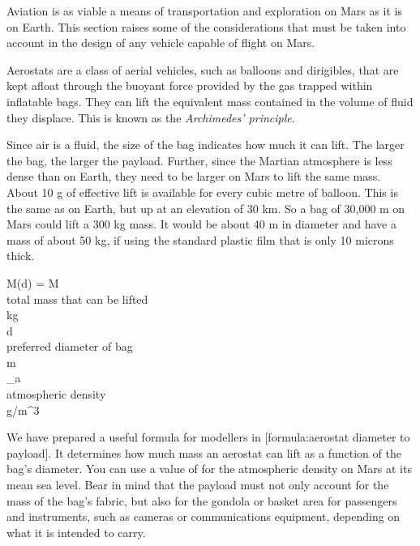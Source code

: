 

Aviation is as viable a means of transportation and exploration on Mars as it is on Earth. This section raises some of the considerations that must be taken into account in the design of any vehicle capable of flight on Mars.

Aerostats are a class of aerial vehicles, such as balloons and dirigibles, that are kept afloat through the buoyant force provided by the gas trapped within inflatable bags. They can lift the equivalent mass contained in the volume of fluid they displace. This is known as the {\it Archimedes' principle}. 

Since air is a fluid, the size of the bag indicates how much it can lift. The larger the bag, the larger the payload. Further, since the Martian atmosphere is less dense than on Earth, they need to be larger on Mars to lift the same mass. About 10 g of effective lift is available for every cubic metre of balloon. This is the same as on Earth, but up at an elevation of 30 km. So a bag of 30,000 m on Mars could lift a 300 kg mass. It would be about 40 m in diameter and have a mass of about 50 kg, if using the standard plastic film that is only 10 microns thick.

\crlf
{}
\startformula
M(d) = 
\stopformula
\startlegend
\leg M \\ total mass that can be lifted \\ kg \\
\leg d \\ preferred diameter of bag \\ m \\
\leg {\rho}_a \\ atmospheric density \\ g/m^{3} \\
\stoplegend
\crlf

We have prepared a useful formula for modellers in [formula:aerostat diameter to payload]. It determines how much mass an aerostat can lift as a function of the bag's diameter. You can use a value of  for the atmospheric density on Mars at its mean sea level. Bear in mind that the payload must not only account for the mass of the bag's fabric, but also for the gondola or basket area for passengers and instruments, such as cameras or communications equipment, depending on what it is intended to carry.

